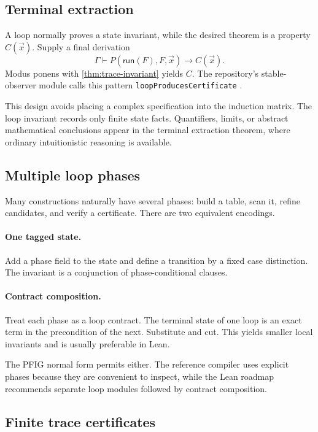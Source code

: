 \subsection{Terminal extraction}

A loop normally proves a state invariant, while the desired theorem is a property \(C(\vec{x})\).  Supply a final derivation
\[
  \Gamma\vdash P(\mathsf{run}(F),F,\vec{x})\to C(\vec{x}).
\]
Modus ponens with 
\cref{thm:trace-invariant} yields \(C\).  The repository's stable-observer module calls this pattern \texttt{loopProducesCertificate} \cite{repo-observable}.

This design avoids placing a complex specification into the induction matrix.  The loop invariant records only finite state facts.  Quantifiers, limits, or abstract mathematical conclusions appear in the terminal extraction theorem, where ordinary intuitionistic reasoning is available.

\subsection{Multiple loop phases}

Many constructions naturally have several phases: build a table, scan it, refine candidates, and verify a certificate.  There are two equivalent encodings.

\paragraph{One tagged state.}
Add a phase field to the state and define a transition by a fixed case distinction.  The invariant is a conjunction of phase-conditional clauses.

\paragraph{Contract composition.}
Treat each phase as a loop contract.  The terminal state of one loop is an exact term in the precondition of the next.  Substitute and cut.  This yields smaller local invariants and is usually preferable in Lean.

The PFIG normal form permits either.  The reference compiler uses explicit phases because they are convenient to inspect, while the Lean roadmap recommends separate loop modules followed by contract composition.

\subsection{Finite trace certificates}

